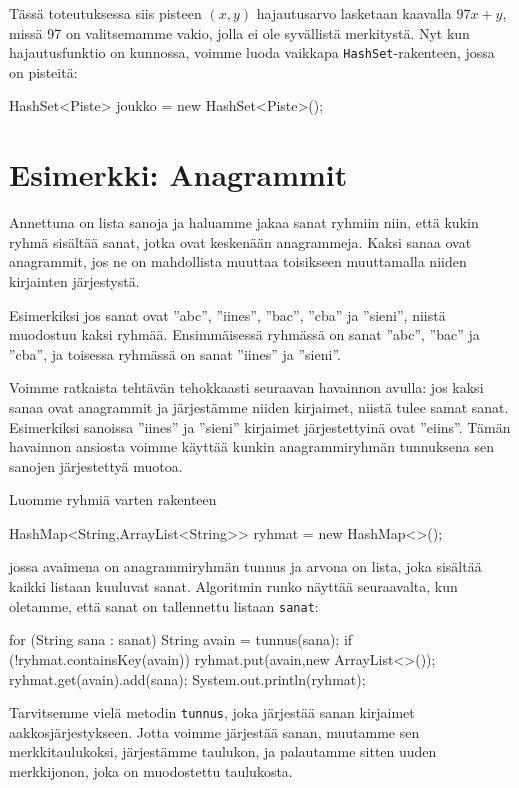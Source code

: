 Tässä toteutuksessa siis pisteen $(x,y)$ hajautusarvo lasketaan
kaavalla $97x+y$, missä 97 on valitsemamme vakio, jolla ei ole
syvällistä merkitystä.
Nyt kun hajautusfunktio on kunnossa,
voimme luoda vaikkapa \texttt{HashSet}-rakenteen, jossa on pisteitä:

\begin{code}
HashSet<Piste> joukko = new HashSet<Piste>();
\end{code}

\section{Esimerkki: Anagrammit}

Annettuna on lista sanoja ja haluamme jakaa sanat ryhmiin niin,
että kukin ryhmä sisältää sanat, jotka ovat keskenään anagrammeja.
Kaksi sanaa ovat anagrammit, jos ne on mahdollista muuttaa toisikseen
muuttamalla niiden kirjainten järjestystä.

Esimerkiksi jos sanat ovat ''abc'', ''iines'', ''bac'', ''cba'' ja ''sieni'',
niistä muodostuu kaksi ryhmää.
Ensimmäisessä ryhmässä on sanat ''abc'', ''bac'' ja ''cba'',
ja toisessa ryhmässä on sanat ''iines'' ja ''sieni''.

Voimme ratkaista tehtävän tehokkaasti seuraavan havainnon avulla:
jos kaksi sanaa ovat anagrammit ja järjestämme niiden kirjaimet,
niistä tulee samat sanat.
Esimerkiksi sanoissa ''iines'' ja ''sieni'' kirjaimet
järjestettyinä ovat ''eiins''.
Tämän havainnon ansiosta voimme käyttää kunkin anagrammiryhmän
tunnuksena sen sanojen järjestettyä muotoa.

Luomme ryhmiä varten rakenteen

\begin{code}
HashMap<String,ArrayList<String>> ryhmat = new HashMap<>();
\end{code}

jossa avaimena on anagrammiryhmän tunnus ja arvona on lista,
joka sisältää kaikki listaan kuuluvat sanat.
Algoritmin runko näyttää seuraavalta, kun oletamme,
että sanat on tallennettu listaan \texttt{sanat}:

\begin{code}
for (String sana : sanat) {
    String avain = tunnus(sana);
    if (!ryhmat.containsKey(avain)) {
        ryhmat.put(avain,new ArrayList<>());
    }
    ryhmat.get(avain).add(sana);
}
System.out.println(ryhmat);
\end{code}

Tarvitsemme vielä metodin \texttt{tunnus}, joka järjestää
sanan kirjaimet aakkosjärjestykseen.
Jotta voimme järjestää sanan, muutamme sen merkkitaulukoksi,
järjestämme taulukon, ja palautamme sitten uuden merkkijonon,
joka on muodostettu taulukosta.

